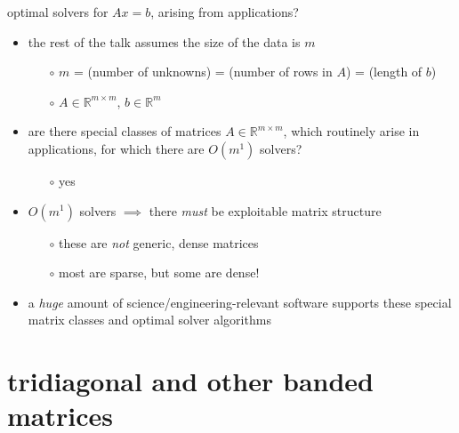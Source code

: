 \documentclass[10pt,
               svgnames,
               hyperref={colorlinks,citecolor=DeepPink4,linkcolor=FireBrick,urlcolor=Maroon},
               usepdftitle=false]{beamer}
\newcommand{\RR}{\mathbb{R}}
\begin{document}
\begin{frame}{optimal solvers for $Ax=b$, arising from applications?}

\begin{itemize}
\item \alert{the rest of the talk assumes the size of the data is $m$}
   \begin{itemize}
   \item[$\circ$] $m$ = (number of unknowns) = (number of rows in $A$) = (length of $b$)
   \item[$\circ$] $A\in\RR^{m\times m}$, $b \in \RR^m$
   \end{itemize}
\item are there special classes of matrices $A\in\RR^{m\times m}$, which routinely arise in applications, for which there are $O(m^1)$ solvers?
   \begin{itemize}
   \item[$\circ$] yes
   \end{itemize}
\item $O(m^1)$ solvers $\implies$ there \emph{must} be exploitable matrix structure
   \begin{itemize}
   \item[$\circ$] these are \emph{not} generic, dense matrices
   \item[$\circ$] most are sparse, but some are dense!
   \end{itemize}
\item a \emph{huge} amount of science/engineering-relevant software supports these special matrix classes and optimal solver algorithms
\end{itemize}
\end{frame}


\section{tridiagonal and other banded matrices}
\end{document}

